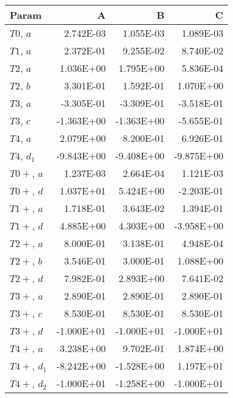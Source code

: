 \begin{tabular}{lrrr}
\toprule
 Param        &          A &          B &          C \\
\midrule
 $T0$, $a$    &  \num{2.742E-03} &  \num{1.055E-03} &  \num{1.089E-03} \\
 $T1$, $a$    &  \num{2.372E-01} &  \num{9.255E-02} &  \num{8.740E-02} \\
 $T2$, $a$    &  \num{1.036E+00} &  \num{1.795E+00} &  \num{5.836E-04} \\
 $T2$, $b$    &  \num{3.301E-01} &  \num{1.592E-01} &  \num{1.070E+00} \\
 $T3$, $a$    & \num{-3.305E-01} & \num{-3.309E-01} & \num{-3.518E-01} \\
 $T3$, $c$    & \num{-1.363E+00} & \num{-1.363E+00} & \num{-5.655E-01} \\
 $T4$, $a$    &  \num{2.079E+00} &  \num{8.200E-01} &  \num{6.926E-01} \\
 $T4$, $d_1$  & \num{-9.843E+00} & \num{-9.408E+00} & \num{-9.875E+00} \\
 $T0+$, $a$   &  \num{1.237E-03} &  \num{2.664E-04} &  \num{1.121E-03} \\
 $T0+$, $d$   &  \num{1.037E+01} &  \num{5.424E+00} & \num{-2.203E-01} \\
 $T1+$, $a$   &  \num{1.718E-01} &  \num{3.643E-02} &  \num{1.394E-01} \\
 $T1+$, $d$   &  \num{4.885E+00} &  \num{4.303E+00} & \num{-3.958E+00} \\
 $T2+$, $a$   &  \num{8.000E-01} &  \num{3.138E-01} &  \num{4.948E-04} \\
 $T2+$, $b$   &  \num{3.546E-01} &  \num{3.000E-01} &  \num{1.088E+00} \\
 $T2+$, $d$   &  \num{7.982E-01} &  \num{2.893E+00} &  \num{7.641E-02} \\
 $T3+$, $a$   &  \num{2.890E-01} &  \num{2.890E-01} &  \num{2.890E-01} \\
 $T3+$, $c$   &  \num{8.530E-01} &  \num{8.530E-01} &  \num{8.530E-01} \\
 $T3+$, $d$   & \num{-1.000E+01} & \num{-1.000E+01} & \num{-1.000E+01} \\
 $T4+$, $a$   &  \num{3.238E+00} &  \num{9.702E-01} &  \num{1.874E+00} \\
 $T4+$, $d_1$ & \num{-8.242E+00} & \num{-1.528E+00} &  \num{1.197E+01} \\
 $T4+$, $d_2$ & \num{-1.000E+01} & \num{-1.258E+00} & \num{-1.000E+01} \\
\bottomrule
\end{tabular}